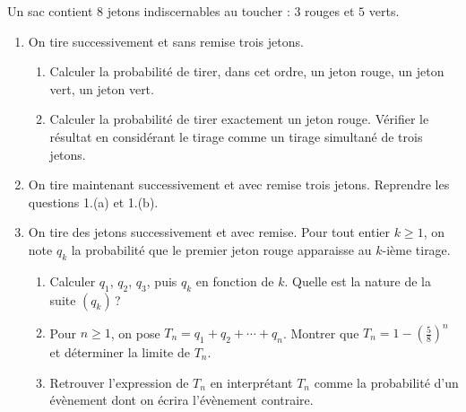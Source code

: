 \begin{exo}\label{exo:proba-13}
Un sac contient $8$ jetons indiscernables au toucher : $3$ rouges et $5$ verts.
\begin{enumerate}
\item On tire successivement et sans remise trois jetons.
      \begin{enumerate}
      \item Calculer la probabilit\'e de tirer, dans cet ordre, un jeton rouge, un jeton vert, un jeton vert.
      \item Calculer la probabilit\'e de tirer exactement un jeton rouge.
            V\'erifier le r\'esultat en consid\'erant le tirage comme un tirage simultan\'e de trois jetons.
      \end{enumerate}
\item On tire maintenant successivement et avec remise trois jetons. Reprendre les questions 1.(a) et 1.(b).
\item On tire des jetons successivement et avec remise.
      Pour tout entier $k \geq 1$, on note $q_k$ la probabilit\'e que le premier jeton rouge apparaisse au $k$-i\`eme tirage.
      \begin{enumerate}
      \item Calculer $q_1$, $q_2$, $q_3$, puis $q_k$ en fonction de $k$.
            Quelle est la nature de la suite $(q_k)$\,?
      \item Pour $n \geq 1$, on pose $T_n = q_1 + q_2 + \cdots + q_n$.
            Montrer que $T_n = 1 - \left(\frac{5}{8}\right)^n$ et d\'eterminer la limite de $T_n$.
      \item Retrouver l'expression de $T_n$ en interpr\'etant $T_n$ comme la probabilit\'e d'un \'ev\`enement
            dont on \'ecrira l'\'ev\`enement contraire.
      \end{enumerate}
\end{enumerate}
\end{exo}
%
